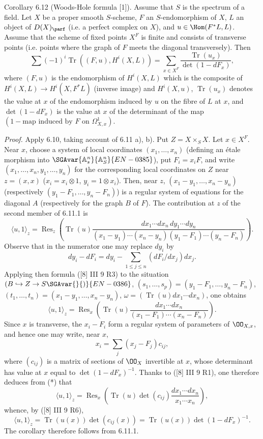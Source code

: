 \begin{statement}{Corollary 6.12}
(Woods-Hole formula [1]). Assume that $S$ is the spectrum of a field. Let $X$ be a proper smooth $S$-scheme, $F$ an $S$-endomorphism of $X$, $L$ an object of $D(X)_{\parf}$ (i.e. a perfect complex on $X$), and $u\in\Hom(F^*L,L)$. Assume that the scheme of fixed points $X^F$ is finite and consists of transverse points (i.e. points where the graph of $F$ meets the diagonal transversely). Then
\[
\sum(-1)^i\operatorname{Tr}((F,u),H^i(X,L))=
\sum_{x\in X^F}\frac{\operatorname{Tr}(u_x)}{\det(1-dF_x)},
\]
where $(F,u)$ is the endomorphism of $H^i(X,L)$ which is the composite of $H^i(X,L)\to H^i(X,F^*L)$ (inverse image) and $H^i(X,u)$, $\operatorname{Tr}(u_x)$ denotes the value at $x$ of the endomorphism induced by $u$ on the fibre of $L$ at $x$, and $\det(1-dF_x)$ is the value at $x$ of the determinant of the map $(1-\text{map induced by }F\text{ on }\Omega^1_{X,x})$.

\emph{Proof.} Apply 6.10, taking account of 6.11 a), b). Put $Z=X\times_S X$. Let $x\in X^F$. Near $x$, choose a system of local coordinates $(x_1,\ldots,x_n)$ (defining an étale morphism into $\SGAvar{\mathbb A_s^n}{\mathbb A_S^n}{EN-0385}$), put $F_i=x_iF$, and write $(x_1,\ldots,x_n,y_1,\ldots,y_n)$ for the corresponding local coordinates on $Z$ near $z=(x,x)$ ($x_i=x_i\otimes1$, $y_i=1\otimes x_i$). Then, near $z$, $(x_1-y_1,\ldots,x_n-y_n)$ (respectively $(y_1-F_1,\ldots,y_n-F_n)$) is a regular system of equations for the diagonal $A$ (respectively for the graph $B$ of $F$). The contribution at $z$ of the second member of 6.11.1 is
\[
\langle u,1\rangle_z=
\operatorname{Res}_z\left(\operatorname{Tr}(u)\frac{dx_1\cdots dx_n\,dy_1\cdots dy_n}{(x_1-y_1)\cdots(x_n-y_n)(y_1-F_1)\cdots(y_n-F_n)}\right).
\]
Observe that in the numerator one may replace $dy_i$ by
\[
dy_i-dF_i=dy_i-\sum_{1\le j\le n}(dF_i/dx_j)dx_j.
\]
Applying then formula ([8] III 9 R3) to the situation $(B\hookrightarrow Z\to S\SGAvar{}{)}{EN-0386}$, $(s_1,\ldots,s_p)=(y_1-F_1,\ldots,y_n-F_n)$, $(t_1,\ldots,t_n)=(x_1-y_1,\ldots,x_n-y_n)$, $\omega=(\operatorname{Tr}(u)dx_1\cdots dx_n)$, one obtains
\begin{equation}
\tag{*}
\langle u,1\rangle_z=
\operatorname{Res}_x\left(\operatorname{Tr}(u)\frac{dx_1\cdots dx_n}{(x_1-F_1)\cdots(x_n-F_n)}\right).
\end{equation}
Since $x$ is transverse, the $x_i-F_i$ form a regular system of parameters of $\OO_{X,x}$, and hence one may write, near $x$,
\[
x_i=\sum_j(x_j-F_j)c_{ij},
\]
where $(c_{ij})$ is a matrix of sections of $\OO_X$ invertible at $x$, whose determinant has value at $x$ equal to $\det(1-dF_x)^{-1}$. Thanks to ([8] III 9 R1), one therefore deduces from (*) that
\[
\langle u,1\rangle_z=\operatorname{Res}_x\left(\operatorname{Tr}(u)\det(c_{ij})\frac{dx_1\cdots dx_n}{x_1\cdots x_n}\right),
\]
whence, by ([8] III 9 R6),
\[
\langle u,1\rangle_z=\operatorname{Tr}(u(x))\det(c_{ij}(x))=\operatorname{Tr}(u(x))\det(1-dF_x)^{-1}.
\]
The corollary therefore follows from 6.11.1.
\end{statement}

